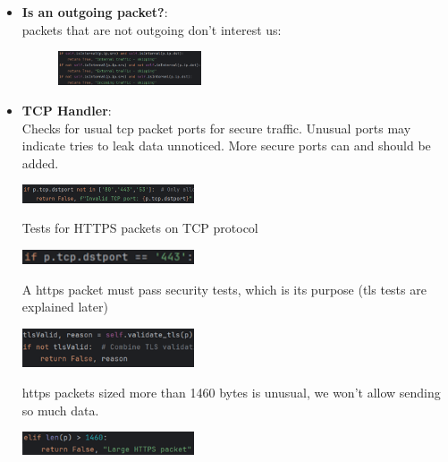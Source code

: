 \documentclass{article}
\begin{document}
\begin{itemize}
    \item \textbf{Is an outgoing packet?}: \\
    packets that are not outgoing don’t interest us:
    \begin{figure}[H]
        \includegraphics[width=0.4\textwidth]{test - isInternal.png}
    \end{figure}

    \newpage
    \item \textbf{TCP Handler}: \\
    Checks for usual tcp packet ports for secure traffic. Unusual ports may indicate tries to leak data unnoticed. More secure ports can and should be added. \\
    \begin{minipage}{\linewidth}
        \includegraphics[width=0.4\textwidth]{test - tcp 1.png}
    \end{minipage}
    Tests for HTTPS packets on TCP protocol \\
    \begin{minipage}{\linewidth}
        \includegraphics[width=0.4\textwidth]{test - tcp 2.png}
    \end{minipage}
    \begin{adjustwidth}{3em}{0em}
        A https packet must pass security tests, which is its purpose (tls tests are explained later) \\ 
        \begin{minipage}{\linewidth}
            \includegraphics[width=0.4\textwidth]{test - tcp 2.1.png}\hspace{3em}
        \end{minipage}
        https packets sized more than 1460 bytes is unusual, we won’t allow sending so much data. \\
        \begin{minipage}{\linewidth}
            \includegraphics[width=0.4\textwidth]{test - tcp 2.2.png}\hspace{3em}

\end{minipage}
\end{adjustwidth}
\end{itemize}
\end{document}

